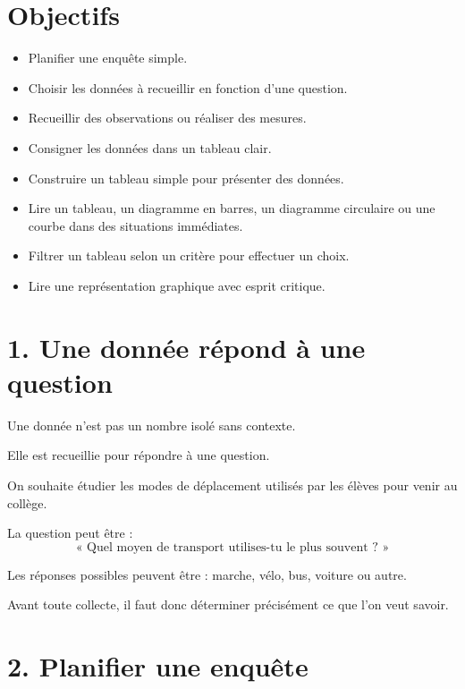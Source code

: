 
\section{Objectifs}

\begin{itemize}
\item Planifier une enquête simple.
\item Choisir les données à recueillir en fonction d'une question.
\item Recueillir des observations ou réaliser des mesures.
\item Consigner les données dans un tableau clair.
\item Construire un tableau simple pour présenter des données.
\item Lire un tableau, un diagramme en barres, un diagramme circulaire ou une courbe dans des situations immédiates.
\item Filtrer un tableau selon un critère pour effectuer un choix.
\item Lire une représentation graphique avec esprit critique.
\end{itemize}

\section{1. Une donnée répond à une question}

Une donnée n'est pas un nombre isolé sans contexte.

Elle est recueillie pour répondre à une question.

\begin{exemple}
On souhaite étudier les modes de déplacement utilisés par les élèves pour venir au collège.

La question peut être :
\[
\text{« Quel moyen de transport utilises-tu le plus souvent ? »}
\]

Les réponses possibles peuvent être : marche, vélo, bus, voiture ou autre.
\end{exemple}

Avant toute collecte, il faut donc déterminer précisément ce que l'on veut savoir.

\section{2. Planifier une enquête}

